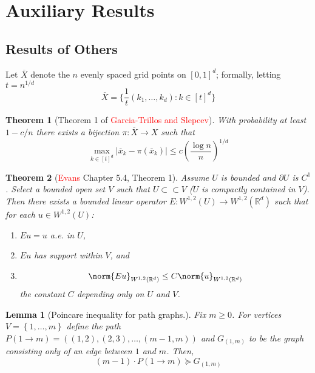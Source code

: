 \documentclass{article}
\newcommand{\Reals}{\mathbb{R}}
\newcommand{\abs}[1]{\left \lvert #1 \right \rvert}
\newcommand{\set}[1]{\left\{#1\right\}}
\newcommand{\1}{\mathbf{1}}
\newcommand{\Rd}{\Reals^d}
\theoremstyle{alden}
\theoremstyle{aldenthm}
\newtheorem{theorem}{Theorem}
\newtheorem{lemma}{Lemma}
\theoremstyle{definition}
\theoremstyle{remark}
\begin{document}
\section{Auxiliary Results}

\subsection{Results of Others}

Let $\overline{X}$ denote the $n$ evenly spaced grid points on $[0,1]^d$; formally, letting $t = n^{1/d}$
\begin{equation*}
\overline{X} = \biggl\{\frac{1}{t}(k_1,\ldots,k_d): k \in [t]^d\biggr\}
\end{equation*}

\begin{theorem}[Theorem 1 of \textcolor{red}{Garcia-Trillos and Slepcev}]
	\label{thm:slepcev_transport_distance}
	With probability at least $1 - c/n$ there exists a bijection $\pi: \overline{X} \to X$ such that
	\begin{equation}
	\label{eqn:slepcev_transport_distance}
	\max_{k \in [t]^d} \abs{\overline{x}_k - \pi(\overline{x}_k)} \leq c \left(\frac{\log n}{n}\right)^{1/d}
	\end{equation}
\end{theorem}

\begin{theorem}[\textcolor{red}{Evans} Chapter 5.4, Theorem 1]
	\label{thm:evans_extension}
	Assume $U$ is bounded and $\partial U$ is $C^1$. Select a bounded open set $V$ such that $U \subset \subset V$ ($U$ is compactly contained in $V$). Then there exists a bounded linear operator $E: W^{1,2}(U) \to W^{1,2}(\Rd)$ such that for each $u \in W^{1,2}(U)$:
	\begin{enumerate}
		\item $Eu = u$ a.e. in $U$,
		\item $Eu$ has support within $V$, and 
		\item 
		\begin{equation*}
		\norm{Eu}_{W^{1,2}(\Rd)} \leq C \norm{u}_{W^{1,2}(\Rd)}
		\end{equation*}
		the constant $C$ depending only on $U$ and $V$.
	\end{enumerate}
\end{theorem}

\begin{lemma}[Poincare inequality for path graphs.]
	\label{lem: path_poincare}
	Fix $m \geq 0$. For vertices $V = \set{1, \ldots,m}$ define the path $P(1 \to m) = ((1,2),(2,3),\ldots, (m-1,m))$ and $G_{(1,m)}$ to be the graph consisting only of an edge between $1$ and $m$. Then,
	\begin{equation*}
	(m - 1) \cdot P(1 \to m) \succeq G_{(1,m)}
	\end{equation*}
\end{lemma}
\end{document}
